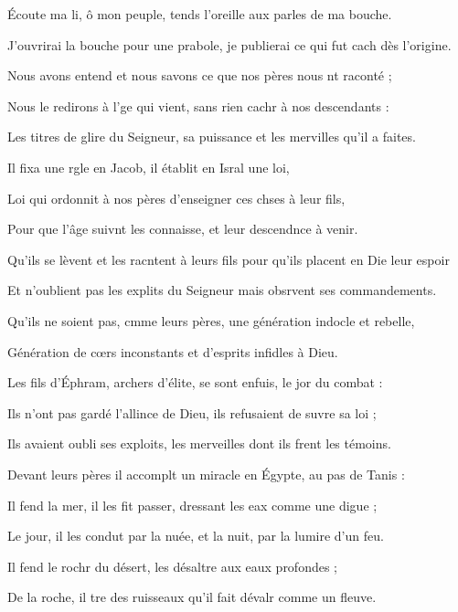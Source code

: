 \item Écoute ma li, ô mon peuple, tends l’oreille aux parles de ma bouche.
\item J’ouvrirai la bouche pour une prabole, je publierai ce qui fut cach dès l’origine.
\item Nous avons entend et nous savons ce que nos pères nous nt raconté ;
\item Nous le redirons à l’ge qui vient, sans rien cachr à nos descendants :
\item Les titres de glire du Seigneur, sa puissance et les mervilles qu’il a faites.
\item Il fixa une rgle en Jacob, il établit en Isral une loi,
\item Loi qui ordonnit à nos pères d’enseigner ces chses à leur fils,
\item Pour que l’âge suivnt les connaisse, et leur descendnce à venir.
\item Qu’ils se lèvent et les racntent à leurs fils pour qu’ils placent en Die leur espoir
\item Et n’oublient pas les explits du Seigneur mais obsrvent ses commandements.
\item Qu’ils ne soient pas, cmme leurs pères, une génération indocle et rebelle,
\item Génération de cœrs inconstants et d’esprits infidles à Dieu.
\item Les fils d’Éphram, archers d’élite, se sont enfuis, le jor du combat :
\item Ils n’ont pas gardé l’allince de Dieu, ils refusaient de suvre sa loi ;
\item Ils avaient oubli ses exploits, les merveilles dont ils frent les témoins.
\item Devant leurs pères il accomplt un miracle en Égypte, au pas de Tanis :
\item Il fend la mer, il les fit passer, dressant les eax comme une digue ;
\item Le jour, il les condut par la nuée, et la nuit, par la lumire d’un feu.
\item Il fend le rochr du désert, les désaltre aux eaux profondes ;
\item De la roche, il tre des ruisseaux qu’il fait dévalr comme un fleuve.
